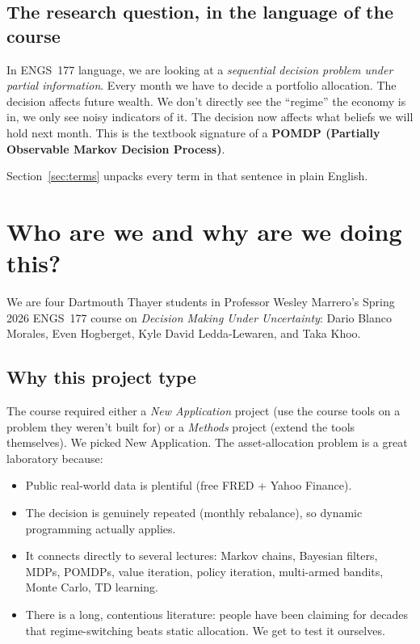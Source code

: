 \documentclass[11pt]{article}
\begin{document}
\subsection{The research question, in the language of the course}

In ENGS~177 language, we are looking at a \emph{sequential decision problem under partial information}. Every month we have to decide a portfolio allocation. The decision affects future wealth. We don't directly see the ``regime'' the economy is in, we only see noisy indicators of it. The decision now affects what beliefs we will hold next month. This is the textbook signature of a \textbf{POMDP (Partially Observable Markov Decision Process)}.

Section~\ref{sec:terms} unpacks every term in that sentence in plain English.

\section{Who are we and why are we doing this?}

We are four Dartmouth Thayer students in Professor Wesley Marrero's Spring 2026 ENGS~177 course on \emph{Decision Making Under Uncertainty}: Dario Blanco Morales, Even Hogberget, Kyle David Ledda-Lewaren, and Taka Khoo.

\subsection{Why this project type}

The course required either a \emph{New Application} project (use the course tools on a problem they weren't built for) or a \emph{Methods} project (extend the tools themselves). We picked New Application. The asset-allocation problem is a great laboratory because:

\begin{itemize}
  \item Public real-world data is plentiful (free FRED + Yahoo Finance).
  \item The decision is genuinely repeated (monthly rebalance), so dynamic programming actually applies.
  \item It connects directly to several lectures: Markov chains, Bayesian filters, MDPs, POMDPs, value iteration, policy iteration, multi-armed bandits, Monte Carlo, TD learning.
  \item There is a long, contentious literature: people have been claiming for decades that regime-switching beats static allocation. We get to test it ourselves.
\end{itemize}
\end{document}
